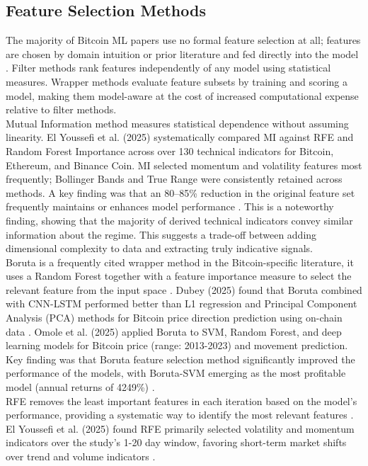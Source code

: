 \subsection{Feature Selection Methods}
The majority of Bitcoin ML papers use no formal feature selection at all; features are chosen by domain intuition or prior literature and fed directly into the model \cite{chenAnalysisBitcoinPrice2023, raoComparativeStudyStatistical2025}. Filter methods rank features independently of any model using statistical measures. Wrapper methods evaluate feature subsets by training and scoring a model, making them model-aware at the cost of increased computational expense relative to filter methods.\\
Mutual Information method measures statistical dependence without assuming linearity. El Youssefi et al. (2025) systematically compared MI against RFE and Random Forest Importance across over 130 technical indicators for Bitcoin, Ethereum, and Binance Coin. MI selected momentum and volatility features most frequently; Bollinger Bands and True Range were consistently retained across methods. A key finding was that an 80–85\% reduction in the original feature set frequently maintains or enhances model performance \cite{youssefiOptimizingForecastAccuracy2025}. This is a noteworthy finding, showing that the majority of derived technical indicators convey similar information about the regime. This suggests a trade-off between adding dimensional complexity to data and extracting truly indicative signals. \\
Boruta is a frequently cited wrapper method in the Bitcoin-specific literature, it uses a Random Forest together with a feature importance measure to select the relevant feature from the input space \cite{kursaFeatureSelectionBoruta2010}. Dubey (2025) found that Boruta combined with CNN-LSTM performed better than L1 regression and Principal Component Analysis (PCA) methods for Bitcoin price direction prediction using on-chain data \cite{dubeyBitcoinPriceDirection2025}. Omole et al. (2025) applied Boruta to SVM, Random Forest, and deep learning models for Bitcoin price (range: 2013-2023) and movement prediction. Key finding was that Boruta feature selection method significantly improved the performance of the models, with Boruta-SVM emerging as the most profitable model (annual returns of 4249\%) \cite{omoleUsingMachineDeep2025}.\\
RFE removes the least important features in each iteration based on the model’s performance, providing a systematic way to identify the most relevant features \cite{youssefiOptimizingForecastAccuracy2025}. El Youssefi et al. (2025) found RFE primarily selected volatility and momentum indicators over the study's 1-20 day window, favoring short-term market shifts over trend and volume indicators \cite{youssefiOptimizingForecastAccuracy2025}.\\
